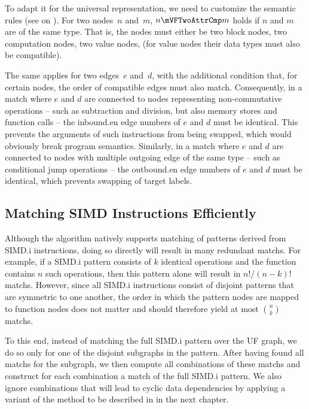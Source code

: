 To adapt it for the \gls{universal representation}, we need to customize the
semantic rules (see  on
).
%
For two \glspl{node}~$n$ and~$m$, \mbox{$n \mVFTwoAttrCmp m$} holds if $n$ and
$m$ are of the same type.
%
That is, the \glspl{node} must either be two \glspl{block node}, two
\glspl{computation node}, two \glspl{value node}, \etc (for \glspl{value node}
their data types must also be compatible).

The same applies for two \glspl{edge}~$e$ and~$d$, with the additional condition
that, for certain \glspl{node}, the order of compatible \glspl{edge} must also
match.
%
Consequently, in a \gls{match} where $e$ and $d$ are connected to \glspl{node}
representing non-commutative \glspl{operation} -- such as subtraction and
division, but also memory stores and function calls -- the \gls{inbound.en}
\glspl{edge number} of $e$ and $d$ must be identical.
%
This prevents the arguments of such \glspl{instruction} from being swapped,
which would obviously break \gls{program} semantics.
%
Similarly, in a \gls{match} where $e$ and $d$ are connected to \glspl{node} with
multiple outgoing \gls{edge} of the same type -- such as conditional jump
\glspl{operation} -- the \gls{outbound.en} \glspl{edge number} of $e$ and $d$
must be identical, which prevents swapping of target labels.


\subsection{Matching SIMD Instructions Efficiently}

Although the algorithm natively supports matching of \glspl{pattern} derived
from \gls{SIMD.i} \glspl{instruction}, doing so directly will result in many
redundant \glspl{match}.
%
For example, if a \gls{SIMD.i} \gls{pattern} consists of $k$ identical
\glspl{operation} and the function contains $n$ such \glspl{operation}, then
this \gls{pattern} alone will result in \mbox{$n! / (n - k)!$} \glspl{match}.
%
However, since all \gls{SIMD.i} \glspl{instruction} consist of disjoint
\glspl{pattern} that are symmetric to one another, the order in which the
\gls{pattern} \glspl{node} are mapped to \gls{function} \glspl{node} does not
matter and should therefore yield at most $\binom{n}{k}$ \glspl{match}.

To this end, instead of matching the full \gls{SIMD.i} \gls{pattern} over the
\gls{UF graph}, we do so only for one of the disjoint \glspl{subgraph} in the
\gls{pattern}.
%
After having found all \glspl{match} for the \gls{subgraph}, we then compute all
combinations of these \glspl{match} and construct for each combination a
\gls{match} of the full \gls{SIMD.i} \gls{pattern}.
%
We also ignore combinations that will lead to cyclic data dependencies by
applying a variant of the method to be described in
 in the next chapter.


